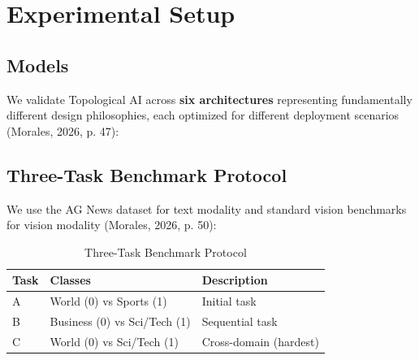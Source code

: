 \documentclass{article}
\begin{document}
\section{Experimental Setup}

\subsection{Models}

We validate Topological AI across \textbf{six architectures} representing fundamentally different design philosophies, each optimized for different deployment scenarios (Morales, 2026, p. 47):

\begin{table}[ht]
\centering
\caption{Architecture Landscape}
\end{table}

\subsection{Three-Task Benchmark Protocol}

We use the AG News dataset for text modality and standard vision benchmarks for vision modality (Morales, 2026, p. 50):

\begin{table}[ht]
\centering
\caption{Three-Task Benchmark Protocol}
\begin{tabular}{lll}
\toprule
Task & Classes & Description \\
\midrule
A & World (0) vs Sports (1) & Initial task \\
B & Business (0) vs Sci/Tech (1) & Sequential task \\
C & World (0) vs Sci/Tech (1) & Cross-domain (hardest) \\
\bottomrule
\end{tabular}
\end{table}
\end{document}
